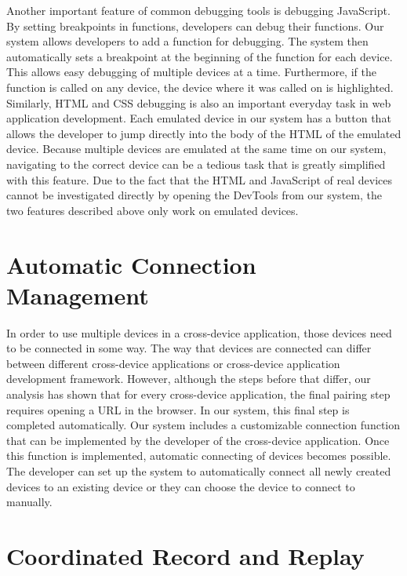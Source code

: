Another important feature of common debugging tools is debugging JavaScript. By setting breakpoints in functions, developers can debug their functions. Our system allows developers to add a function for debugging. The system then automatically sets a breakpoint at the beginning of the function for each device. This allows easy debugging of multiple devices at a time. Furthermore, if the function is called on any device, the device where it was called on is highlighted. Similarly, HTML and CSS debugging is also an important everyday task in web application development. Each emulated device in our system has a button that allows the developer to jump directly into the body of the HTML of the emulated device. Because multiple devices are emulated at the same time on our system, navigating to the correct device can be a tedious task that is greatly simplified with this feature. Due to the fact that the HTML and JavaScript of real devices cannot be investigated directly by opening the DevTools from our system, the two features described above only work on emulated devices. 

\section{Automatic Connection Management}

In order to use multiple devices in a cross-device application, those devices need to be connected in some way. The way that devices are connected can differ between different cross-device applications or cross-device application development framework. However, although the steps before that differ, our analysis has shown that for every cross-device application, the final pairing step requires opening a URL in the browser. In our system, this final step is completed automatically. Our system includes a customizable connection function that can be implemented by the developer of the cross-device application. Once this function is implemented, automatic connecting of devices becomes possible. The developer can set up the system to automatically connect all newly created devices to an existing device or they can choose the device to connect to manually.

\section{Coordinated Record and Replay}

